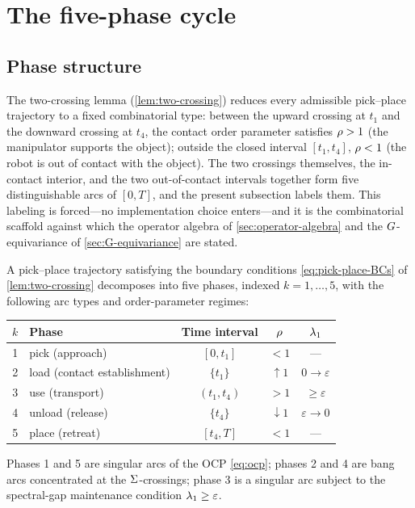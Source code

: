 \section{The five-phase cycle}
\label{sec:phase-cycle}

\subsection{Phase structure}
\label{sec:phase-structure}

The two-crossing lemma (\cref{lem:two-crossing}) reduces every
admissible pick--place trajectory to a fixed combinatorial type:
between the upward crossing at $t_{1}$ and the downward crossing
at $t_{4}$, the contact order parameter satisfies $\rho > 1$
(the manipulator supports the object); outside the closed interval
$[t_{1}, t_{4}]$, $\rho < 1$ (the robot is out of contact
with the object). The two crossings themselves, the in-contact
interior, and the two out-of-contact intervals together form
five distinguishable arcs of $[0, T]$, and the present subsection
labels them. This labeling is forced---no implementation choice
enters---and it is the combinatorial scaffold against which the
operator algebra of \cref{sec:operator-algebra} and the
$G$-equivariance of \cref{sec:G-equivariance} are stated.

\begin{definition}\label{def:five-phase}
A pick--place trajectory satisfying the boundary conditions
\eqref{eq:pick-place-BCs} of \cref{lem:two-crossing} decomposes
into five phases, indexed $k = 1, \ldots, 5$, with the following
arc types and order-parameter regimes:

\begin{center}
\small
\begin{tabular}{@{}clccc@{}}
\toprule
$k$ & Phase & Time interval & $\rho$ & $\lambda_{1}$ \\
\midrule
1 & pick (approach) & $[0, t_{1}]$ & $< 1$ & --- \\
2 & load (contact establishment) & $\{t_{1}\}$ & $\uparrow 1$ & $0 \to \varepsilon$ \\
3 & use (transport) & $(t_{1}, t_{4})$ & $> 1$ & $\ge \varepsilon$ \\
4 & unload (release) & $\{t_{4}\}$ & $\downarrow 1$ & $\varepsilon \to 0$ \\
5 & place (retreat) & $[t_{4}, T]$ & $< 1$ & --- \\
\bottomrule
\end{tabular}
\end{center}

Phases 1 and 5 are singular arcs of the OCP \eqref{eq:ocp};
phases 2 and 4 are bang arcs concentrated at the
$\Sigma$-crossings; phase 3 is a singular arc subject to the
spectral-gap maintenance condition $\lambda_{1} \ge \varepsilon$.
\end{definition}

